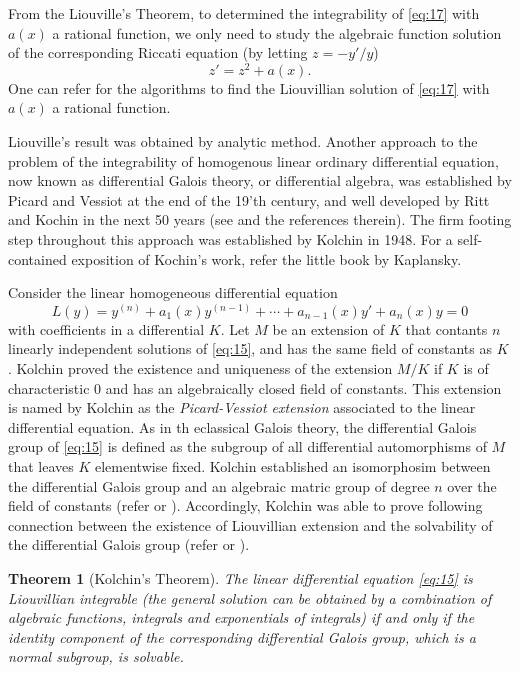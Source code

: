 \documentclass[preprint, 12pt]{elsarticle}
\newtheorem{thm}{Theorem}[section]
\numberwithin{equation}{section}
\begin{document}
From the Liouville's Theorem, to determined the integrability of \eqref{eq:17} with $a(x)$ a rational function, we only need to study the algebraic
function solution of the corresponding Riccati equation (by letting $z = -y'/y$) 
$$z' = z^2 + a(x).$$
One can refer \cite{Kova:86,Lei:00,S:01} for the algorithms to find the Liouvillian solution of \eqref{eq:17} with $a(x)$ a rational function.

Liouville's result was obtained by analytic method. Another approach to the problem
of the integrability of homogenous linear ordinary differential
equation, now known as differential Galois theory, or differential algebra, was established
by Picard and Vessiot at the end of the 19'th century, and well developed by Ritt and Kochin in the next 50 years (see \cite{K:73, Ritt:50} and the references therein). The firm footing step throughout this approach was established by Kolchin in 1948\cite{K:48-1, K:48-2}. For a self-contained exposition of Kochin's work, refer the little book by Kaplansky\cite{Ka:76}.

Consider the linear homogeneous differential equation
\begin{equation}
\label{eq:15} L(y) = y^{(n)} + a_1(x)y^{(n-1)} + \cdots + a_{n-1}(x)y' + a_n(x)y = 0
\end{equation}
with coefficients in a differential $K$.  Let $M$ be an extension of $K$ that contants $n$ linearly independent solutions of \eqref{eq:15}, and has the same field of constants as $K$. Kolchin proved the existence and uniqueness of the extension $M/K$ if $K$ is of characteristic 0 and has an algebraically closed field of constants. This extension is named by Kolchin as the \textit{Picard-Vessiot extension} associated to the linear differential equation. As in th eclassical Galois theory, the differential Galois group of \eqref{eq:15} is defined as the subgroup of all differential automorphisms of $M$  that leaves $K$ elementwise fixed. Kolchin established an isomorphosim between the differential Galois group and an algebraic matric group of degree $n$ over the field of constants   (refer \cite{K:48-2} or \cite[Lemma 5.4]{Ka:76}).  Accordingly, Kolchin was able to prove following connection between the existence of Liouvillian extension and the solvability of the differential Galois group (refer \cite{K:48-2} or \cite[Theorem 5.11-5.12]{Ka:76}).

\begin{thm}[Kolchin's Theorem]\cite{Ka:76, K:48-2}
The linear differential equation \eqref{eq:15} is Liouvillian integrable (the general solution can be obtained by a combination of algebraic functions, integrals and exponentials of
integrals) if and only if the identity component of the corresponding differential Galois group, which is a normal subgroup, is solvable. 
\end{thm}
\end{document}
